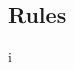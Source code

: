 \documentclass[a4paper, 11pt]{article}
\begin{document}




\subsection{Rules}

i%



\end{document}
